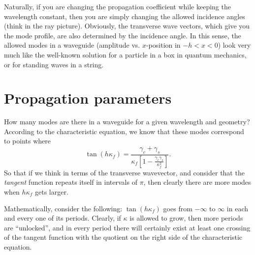 Naturally, if you are changing the propagation coefficient while keeping the wavelength constant, then you are simply changing the allowed incidence angles (think in the ray picture). Obviously, the transverse wave vectors, which give you the mode profile, are also determined by the incidence angle. In this sense, the allowed modes in a waveguide (amplitude vs. $x$-position in $-h<x<0$) look very much like the well-known solution for a particle in a box in quantum mechanics, or for standing waves in a string.


\section{Propagation parameters}

How many modes are there in a waveguide for a given wavelength and geometry? According to the characteristic equation, we know that these modes correspond to points where
\begin{equation}
    \tan(h\kappa_f)=\frac{\gamma_c+\gamma_s}{\kappa_f\left[1-\frac{\gamma_c\gamma_s}{\kappa_f^2}\right]}.
\end{equation}
So that if we think in terms of the transverse wavevector, and consider that the \textit{tangent} function repeats itself in intervals of $\pi$, then clearly there are more modes when $h\kappa_f$ gets larger.

Mathematically, consider the following: $\tan(h\kappa_f)$ goes from $-\infty$ to $\infty$ in each and every one of its periods. Clearly, if $\kappa$ is allowed to grow, then more periods are ``unlocked'', and in every period there will certainly exist at least one crossing of the tangent function with the quotient on the right side of the characteristic equation.

